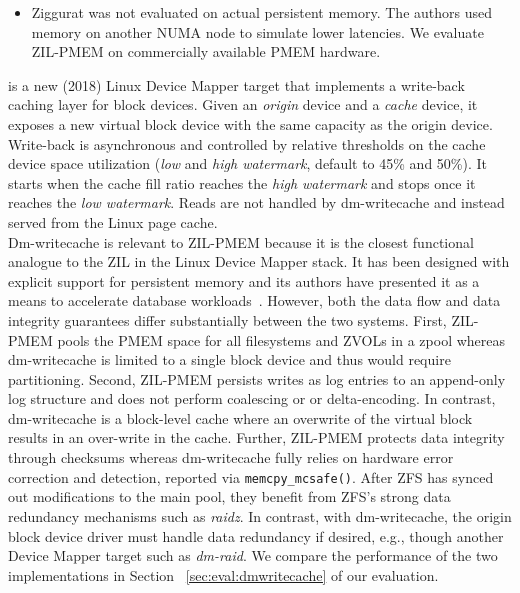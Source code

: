 \documentclass[12pt,a4paper,twoside]{book}
\begin{document}
\begin{itemize}[noitemsep,beginpenalty=100000,midpenalty=100000]
    \item Ziggurat was not evaluated on actual persistent memory. The authors used memory on another NUMA node to simulate lower latencies.
          We evaluate ZIL-PMEM on commercially available PMEM hardware.
\end{itemize}

 is a new (2018) Linux Device Mapper target that implements a write-back caching layer for block devices.
Given an \textit{origin} device and a \textit{cache} device, it exposes a new virtual block device with the same capacity as the origin device.
Write-back is asynchronous and controlled by relative thresholds on the cache device space utilization (\textit{low} and \textit{high watermark}, default to 45\% and 50\%).
It starts when the cache fill ratio reaches the \textit{high watermark} and stops once it reaches the \textit{low watermark}.
Reads are not handled by dm-writecache and instead served from the Linux page cache.~\cite{WritecacheTargetLinux}
\\
Dm-writecache is relevant to ZIL-PMEM because it is the closest functional analogue to the ZIL in the Linux Device Mapper stack.
It has been designed with explicit support for persistent memory and its authors have presented it as a means to accelerate database workloads~\cite{tadakamadlaAcceleratingDatabaseWorkloads2019}.
However, both the data flow and data integrity guarantees differ substantially between the two systems.
First, ZIL-PMEM pools the PMEM space for all filesystems and ZVOLs in a zpool whereas dm-writecache is limited to a single block device and thus would require partitioning.
Second, ZIL-PMEM persists writes as log entries to an append-only log structure and does not perform coalescing or or delta-encoding.
In contrast, dm-writecache is a block-level cache where an overwrite of the virtual block results in an over-write in the cache.
Further, ZIL-PMEM protects data integrity through checksums whereas dm-writecache fully relies on hardware error correction and detection, reported via \lstinline{memcpy_mcsafe()}.
After ZFS has synced out modifications to the main pool, they benefit from ZFS's strong data redundancy mechanisms such as \textit{raidz}.
In contrast, with dm-writecache, the origin block device driver must handle data redundancy if desired, e.g., though another Device Mapper target such as \textit{dm-raid}.
We compare the performance of the two implementations in Section ~\ref{sec:eval:dmwritecache} of our evaluation.
\end{document}
